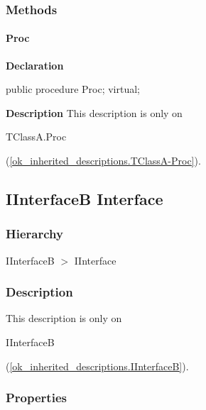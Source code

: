 \documentclass{report}
\begin{document}
\subsubsection*{\large{\textbf{Methods}}\normalsize\hspace{1ex}\hfill}
\paragraph*{Proc}\hspace*{\fill}

\begin{list}{}{
\setlength{\itemindent}{0cm}
\setlength{\listparindent}{0cm}
\setlength{\leftmargin}{\evensidemargin}
\addtolength{\leftmargin}{\tmplength}
\settowidth{\labelsep}{X}
\addtolength{\leftmargin}{\labelsep}
\setlength{\labelwidth}{\tmplength}
}
\begin{flushleft}
\item[\textbf{Declaration}\hfill]
\begin{ttfamily}
public procedure Proc; virtual;\end{ttfamily}


\end{flushleft}
\par
\item[\textbf{Description}]
This description is only on \begin{ttfamily}TClassA.Proc\end{ttfamily}(\ref{ok_inherited_descriptions.TClassA-Proc}).

\end{list}
\subsection*{IInterfaceB Interface}
\subsubsection*{\large{\textbf{Hierarchy}}\normalsize\hspace{1ex}\hfill}
IInterfaceB {$>$} IInterface
\subsubsection*{\large{\textbf{Description}}\normalsize\hspace{1ex}\hfill}
This description is only on \begin{ttfamily}IInterfaceB\end{ttfamily}(\ref{ok_inherited_descriptions.IInterfaceB}).\subsubsection*{\large{\textbf{Properties}}\normalsize\hspace{1ex}\hfill}
\end{document}
